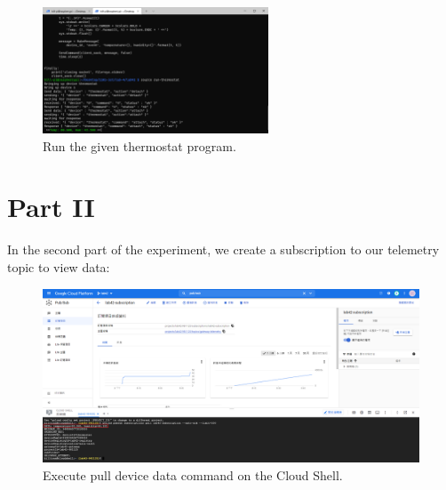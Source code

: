 \documentclass[12pt, a4paper, onside]{article}
\begin{document}
\begin{figure}[h]
  \centering
  \includegraphics[width=0.6\textwidth]{img/12_local_run_thermostat}
  \caption{Run the given thermostat program.}
\end{figure}
\clearpage

\section{Part II}
In the second part of the experiment, we create a subscription to our telemetry topic to view data:
\begin{figure}[h]
  \centering
  \includegraphics[width=\textwidth]{img/13_cloud_subscription}
  \caption{Execute pull device data command on the Cloud Shell.}
\end{figure}
\end{document}
